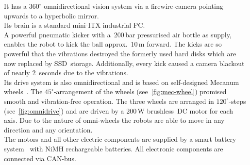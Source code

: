 \documentclass[12pt,a4paper]{article}
\begin{document}
It has a $360^\circ$ omnidirectional vision system via a firewire-camera pointing upwards to a hyperbolic mirror.\\
Its brain is a standard mini-ITX industrial PC.\\
A powerful pneumatic kicker with a~200\,bar pressurised air bottle as supply, enables the robot to kick the ball approx.\ 10\,m forward.
The kicks are so powerful that the vibrations destroyed the formerly used hard disks which are now replaced by SSD~storage.
Additionally, every kick caused a camera blackout of nearly 2~seconds due to the vibrations.\\
Its drive system is also omnidirectional and is based on self-designed Mecanum wheels~\cite{mecanum2007}. 
The $45^\circ$\mbox{-}arrangement of the wheels (see~\autoref{fig:mec-wheel}) promised smooth and vibration-free operation.
The three wheels are arranged in $120^\circ$\mbox{-}steps (see~\autoref{fig:omnidrive}) and are driven by a 200\,W brushless~DC motor for each axis.
Due to the nature of omni-wheels the robots are able to move in any direction and any orientation.\\
The motors and all other electric components are supplied by a smart battery system~\cite{krammer06} with NiMH rechargeable batteries.
All electronic components are connected via CAN-bus.
\end{document}
